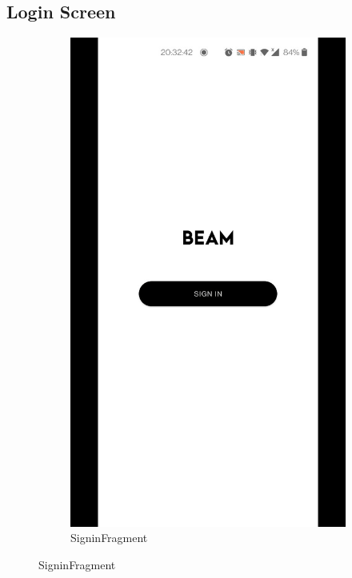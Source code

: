 \documentclass[../report.tex]{subfiles}
\begin{document}
\subsection{Login Screen}
\begin{figure} [H]
	\centering
	\begin{subfigure}[b]{0.28\textwidth}
		\centering
		\includegraphics[width=\textwidth]{../images/07/02-app-signin.jpg}
		\caption{SigninFragment}
		\label{fig:app-signin-frag}
	\end{subfigure}

\end{figure}
\end{document}
